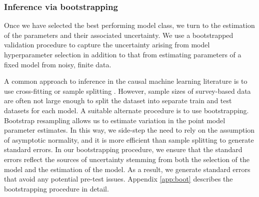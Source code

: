 \documentclass[12pt, a4paper]{article}
\begin{document}
\subsubsection*{Inference via bootstrapping}

Once we have selected the best performing model class, we turn to the
estimation of the parameters and their associated uncertainty. We use a
bootstrapped validation procedure to capture the uncertainty arising from
model hyperparameter selection in addition to that from estimating parameters
of a fixed model from noisy, finite data. 


A common approach to inference in the causal machine learning literature is to use cross-ﬁtting \citep{cherno2018} or sample splitting \citep{athey2019}. However, sample sizes of survey-based data are often not large enough to split the dataset into separate train and test datasets for each model. A suitable alternate procedure is to use bootstrapping. Bootstrap resampling
allows us to estimate variation in the point model parameter estimates. In this
way, we side-step the need to rely on the assumption of asymptotic normality,
and it is more efficient than sample splitting to generate standard errors. In
our bootstrapping procedure, we ensure that the standard errors reflect the
sources of uncertainty stemming from both the selection of the model and the
estimation of the model. As a result, we generate standard errors that avoid
any potential pre-test issues. Appendix \ref{app:boot} describes the bootstrapping procedure in detail.
\end{document}
